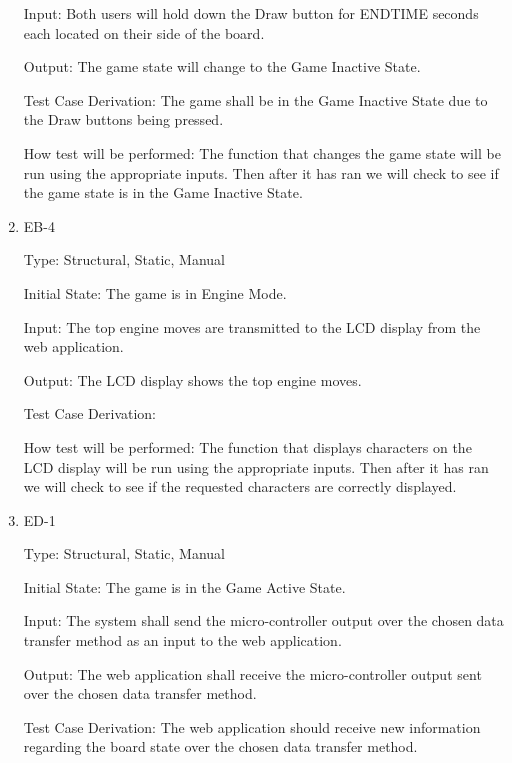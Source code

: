 \documentclass[12pt, titlepage]{article}
\begin{document}
\begin{enumerate}
    Input: Both users will hold down the Draw button for ENDTIME seconds each located on their side of the board.
                        
    Output: The game state will change to the Game Inactive State.
                        
    Test Case Derivation: The game shall be in the Game Inactive State due to the Draw buttons being pressed.
    
    How test will be performed: The function that changes the game state will be run using the appropriate inputs.
    Then after it has ran we will check to see if the game state is in the Game Inactive State.

    \item{EB-4\\}

    Type: Structural, Static, Manual
                      
    Initial State: The game is in Engine Mode.
                        
    Input: The top engine moves are transmitted to the LCD display from the web application.
                        
    Output: The LCD display shows the top engine moves.
                        
    Test Case Derivation: 
    
    How test will be performed: The function that displays characters on the LCD display will be run using the appropriate inputs.
    Then after it has ran we will check to see if the requested characters are correctly displayed.

    \item{ED-1\\}

    Type: Structural, Static, Manual
                      
    Initial State: The game is in the Game Active State.
                        
    Input: The system shall send the micro-controller output over the chosen data transfer
    method as an input to the web application.
                        
    Output: The web application shall receive the micro-controller output sent over the chosen data transfer
    method.
                        
    Test Case Derivation: The web application should receive new information regarding the board state over the chosen data transfer method. 


\end{enumerate}
\end{document}
